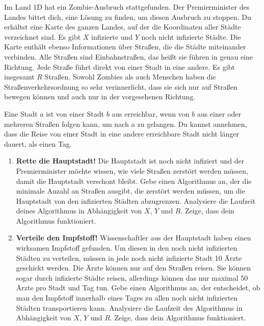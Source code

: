 \documentclass{uebung_cs}
\begin{document}
\begin{aufgabe}
    Im Land 1D hat ein Zombie-Ausbruch stattgefunden. Der Premierminister des Landes bittet dich, eine Lösung zu finden, um diesen Ausbruch zu stoppen. Du erhältst eine Karte des ganzen Landes, auf der die Koordinaten aller Städte verzeichnet sind. Es gibt $X$ infizierte und $Y$ noch nicht infizierte Städte. Die Karte enthält ebenso Informationen über Straßen, die die Städte miteinander verbinden. Alle Straßen sind Einbahnstraßen, das heißt sie führen in genau eine Richtung. Jede Straße führt direkt von einer Stadt in eine andere. Es gibt insgesamt $R$ Straßen. Sowohl Zombies als auch Menschen haben die Straßenverkehrsordnung so sehr verinnerlicht, dass sie sich nur auf Straßen bewegen können und auch nur in der vorgesehenen Richtung.
 
    Eine Stadt $a$ ist von einer Stadt $b$ aus erreichbar, wenn von $b$ aus einer oder mehreren Straßen folgen kann, um nach $a$ zu gelangen. Du kannst annehmen, dass die Reise von einer Stadt in eine andere erreichbare Stadt nicht länger dauert, als einen Tag.
    \begin{enumerate}
        \item \textbf{Rette die Hauptstadt!} Die Hauptstadt ist noch nicht infiziert und der Premierminister möchte wissen, wie viele Straßen zerstört werden müssen, damit die Hauptstadt verschont bleibt. Gebe einen Algorithmus an, der die minimale Anzahl an Straßen ausgibt, die zerstört werden müssen, um die Hauptstadt von den infizierten Städten abzugrenzen. Analysiere die Laufzeit deines Algorithmus in Abhängigkeit von $X$, $Y$ und $R$. Zeige, dass dein Algorithmus funktioniert. \\
        \item \textbf{Verteile den Impfstoff!} Wissenschaftler aus der Hauptstadt haben einen wirksamen Impfstoff gefunden. Um diesen in den noch nicht infizierten Städten zu verteilen, müssen in jede noch nicht infizierte Stadt 10 Ärzte geschickt werden. Die Ärzte können nur auf den Straßen reisen. Sie können sogar durch infizierte Städte reisen, allerdings können das nur maximal 50 Ärzte pro Stadt und Tag tun. Gebe einen Algorithmus an, der entscheidet, ob man den Impfstoff innerhalb eines Tages zu allen noch nicht infizierten Städten transportieren kann. Analysiere die Laufzeit des Algorithmus in Abhängigkeit von $X$, $Y$ und $R$. Zeige, dass dein Algorithmus funktioniert.
    \end{enumerate}
\end{aufgabe}
\end{document}
